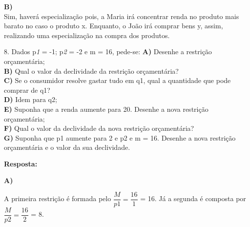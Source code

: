 \documentclass[a4paper, 12pt]{article} %
\begin{document}
\begin{flushleft}
\textbf{B)}
\\
Sim, haverá especialização pois, a Maria irá concentrar renda no produto mais barato no caso o produto x. Enquanto, o João irá comprar bens y, assim, realizando uma especialização na compra dos produtos. \singlespacing

8. Dados p\textit{1} = -1; p\textit{2} = -2 e m = 16, pede-se:
\singlespacing
\textbf{A)} Desenhe a restrição orçamentária;
\\
\textbf{B)} Qual o valor da declividade da restrição orçamentária?
\\
\textbf{C)} Se o consumidor resolve gastar tudo em q1, qual a quantidade que pode comprar de q1?
\\
\textbf{D)} Idem para q2;
\\
\textbf{E)} Suponha que a renda aumente para 20. Desenhe a nova restrição orçamentária;
\\
\textbf{F)} Qual o valor da declividade da nova restrição orçamentária?
\\
\textbf{G)} Suponha que p1 aumente para 2 e p2 e m = 16. Desenhe a nova restrição orçamentária e o valor da sua declividade.

\singlespacing

\textbf{Resposta:} \singlespacing

\textbf{A)}
\\
\begin{center}

A primeira restrição é formada pelo $\dfrac{M}{p\textit{1}} = \dfrac{16}{1}$ = 16. 
\singlespacing
Já a segunda é composta por $\dfrac{M}{p\textit{2}} = \dfrac{16}{2}$ = 8.

\end{center}



\end{flushleft}
\end{document}
